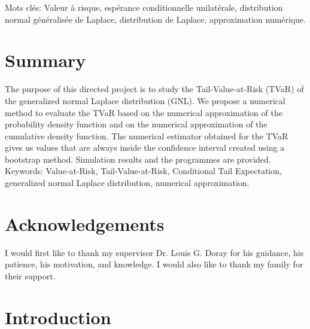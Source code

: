 \documentclass[12pt,travaildirige,nobabel, twoside]{dms}
\numberwithin{equation}{section}
\numberwithin{table}{chapter}
\numberwithin{figure}{chapter}
\begin{document}
\bigskip
 
\noindent Mots clés: Valeur à risque, espérance conditionnelle unilatérale, distribution normal généralisée de Laplace, distribution de Laplace, approximation numérique.	%



\chapter*{Summary}

The purpose of this directed project is to study the Tail-Value-at-Risk (TVaR) of the generalized normal Laplace distribution (GNL).
We propose a numerical method to evaluate the TVaR based on the numerical approximation of the probability density function and on the numerical approximation of the cumulative density function.
The numerical estimator obtained for the TVaR gives us values that are always inside the confidence interval created using a bootstrap method.
Simulation results and the programmes are provided. \\

\bigskip
\noindent Keywords: Value-at-Risk, Tail-Value-at-Risk, Conditional Tail Expectation, generalized normal Laplace distribution, numerical approximation.

\tableofcontents				%
\listoffigures					%
\listoftables					%



\chapter*{Acknowledgements}
I would first like to thank my supervisor Dr. Louis G. Doray for his guidance, his patience, his motivation, and knowledge. I would also like to thank my family for their support. 


\NoChapterPageNumber 
{}




\chapter*{Introduction}
\end{document}
